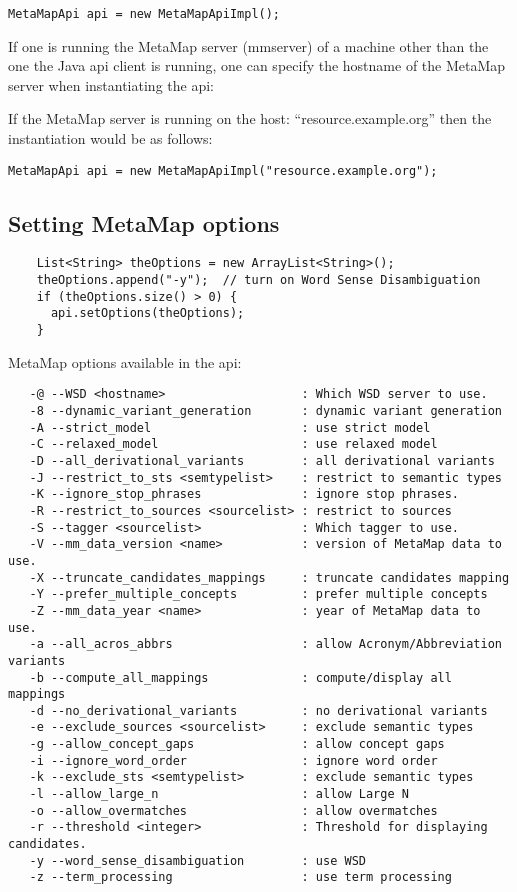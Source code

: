 \documentclass[11pt]{article}
\begin{document}
\begin{verbatim}
MetaMapApi api = new MetaMapApiImpl();
\end{verbatim}

If one is running the MetaMap server (mmserver) of a machine other
than the one the Java api client is running, one can specify the
hostname of the MetaMap server when instantiating the api:


If the MetaMap server is running on the host: ``resource.example.org''
then the instantiation would be as follows:

\begin{verbatim}
MetaMapApi api = new MetaMapApiImpl("resource.example.org");
\end{verbatim}

\subsection{Setting MetaMap options}
\label{Setting MetaMap options}
\begin{verbatim}
    List<String> theOptions = new ArrayList<String>();
    theOptions.append("-y");  // turn on Word Sense Disambiguation
    if (theOptions.size() > 0) {
      api.setOptions(theOptions);
    }
\end{verbatim}

MetaMap options available in the api: 

\begin{verbatim}
   -@ --WSD <hostname>                   : Which WSD server to use.
   -8 --dynamic_variant_generation       : dynamic variant generation
   -A --strict_model                     : use strict model 
   -C --relaxed_model                    : use relaxed model 
   -D --all_derivational_variants        : all derivational variants
   -J --restrict_to_sts <semtypelist>    : restrict to semantic types
   -K --ignore_stop_phrases              : ignore stop phrases.
   -R --restrict_to_sources <sourcelist> : restrict to sources
   -S --tagger <sourcelist>              : Which tagger to use.
   -V --mm_data_version <name>           : version of MetaMap data to use.
   -X --truncate_candidates_mappings     : truncate candidates mapping
   -Y --prefer_multiple_concepts         : prefer multiple concepts
   -Z --mm_data_year <name>              : year of MetaMap data to use.
   -a --all_acros_abbrs                  : allow Acronym/Abbreviation variants
   -b --compute_all_mappings             : compute/display all mappings
   -d --no_derivational_variants         : no derivational variants
   -e --exclude_sources <sourcelist>     : exclude semantic types
   -g --allow_concept_gaps               : allow concept gaps
   -i --ignore_word_order                : ignore word order
   -k --exclude_sts <semtypelist>        : exclude semantic types
   -l --allow_large_n                    : allow Large N
   -o --allow_overmatches                : allow overmatches 
   -r --threshold <integer>              : Threshold for displaying candidates. 
   -y --word_sense_disambiguation        : use WSD 
   -z --term_processing                  : use term processing 
\end{verbatim}
\end{document}
